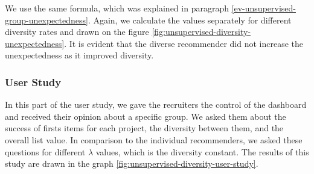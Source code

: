 We use the same formula, which was explained in paragraph \ref{ev-unsupervised-group-unexpectedness}. Again, we calculate the values separately for different diversity rates and drawn on the figure \ref{fig:unsupervised-diversity-unexpectedness}. It is evident that the diverse recommender did not increase the unexpectedness as it improved diversity.


\subsubsection{User Study}

In this part of the user study, we gave the recruiters the control of the dashboard and received their opinion about a specific group. We asked them about the success of firsts items for each project, the diversity between them, and the overall list value. In comparison to the individual recommenders, we asked these questions for different $\lambda$ values, which is the diversity constant. The results of this study are drawn in the graph \ref{fig:unsupervised-diversity-user-study}.

